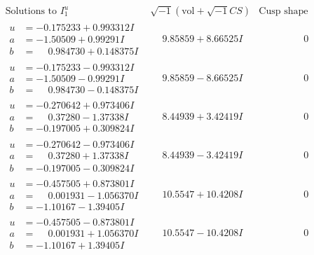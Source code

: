 \documentclass[1p]{elsarticle_modified}
\theoremstyle{definition}
\newcommand{\I}{\sqrt{-1}}
\begin{document}
$$\begin{array}{c|c|c}  
\text{Solutions to }I^u_{1}& \I (\text{vol} + \sqrt{-1}CS) & \text{Cusp shape}\\
 \hline 
\begin{aligned}
u &= -0.175233 + 0.993312 I \\
a &= -1.50509 + 0.99291 I \\
b &= \phantom{-}0.984730 + 0.148375 I\end{aligned}
 & \phantom{-}9.85859 + 8.66525 I & \phantom{-0.000000 } 0 \\ \hline\begin{aligned}
u &= -0.175233 - 0.993312 I \\
a &= -1.50509 - 0.99291 I \\
b &= \phantom{-}0.984730 - 0.148375 I\end{aligned}
 & \phantom{-}9.85859 - 8.66525 I & \phantom{-0.000000 } 0 \\ \hline\begin{aligned}
u &= -0.270642 + 0.973406 I \\
a &= \phantom{-}0.37280 - 1.37338 I \\
b &= -0.197005 + 0.309824 I\end{aligned}
 & \phantom{-}8.44939 + 3.42419 I & \phantom{-0.000000 } 0 \\ \hline\begin{aligned}
u &= -0.270642 - 0.973406 I \\
a &= \phantom{-}0.37280 + 1.37338 I \\
b &= -0.197005 - 0.309824 I\end{aligned}
 & \phantom{-}8.44939 - 3.42419 I & \phantom{-0.000000 } 0 \\ \hline\begin{aligned}
u &= -0.457505 + 0.873801 I \\
a &= \phantom{-}0.001931 - 1.056370 I \\
b &= -1.10167 - 1.39405 I\end{aligned}
 & \phantom{-}10.5547 + 10.4208 I & \phantom{-0.000000 } 0 \\ \hline\begin{aligned}
u &= -0.457505 - 0.873801 I \\
a &= \phantom{-}0.001931 + 1.056370 I \\
b &= -1.10167 + 1.39405 I\end{aligned}
 & \phantom{-}10.5547 - 10.4208 I & \phantom{-0.000000 } 0 \\ \hline\begin{aligned}

\end{aligned}
\end{array}$$
\end{document}
